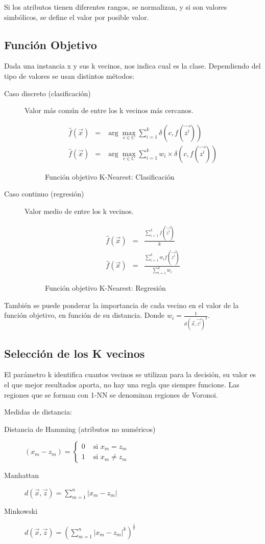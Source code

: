 \documentclass[12pt]{report} %
\begin{document}
Si los atributos tienen diferentes rangos, se normalizan, y si son valores simbólicos, se define el valor por posible valor.
\subsection{Función Objetivo}
Dada una instancia x y sus k vecinos, nos indica cual es la clase. Dependiendo del tipo de valores se usan distintos métodos:
\begin{description}
  \item[Caso discreto (clasificación)] Valor más común de entre los k vecinos más cercanos.
  \begin{figure}[H]
    \begin{eqnarray}
      \hat{f}(\vec{x}) &=& \arg\max _{c \in C} \sum^k_{i=1} \delta(c,f(\vec{z^i})) \\
      \hat{f}(\vec{x}) &=& \arg\max _{c \in C} \sum^k_{i=1} w_i \times \delta(c,f(\vec{z^i}))
    \end{eqnarray}
    \captionsetup{justification=centering}
    \caption{Función objetivo K-Nearest: Clasificación}
  \end{figure} 
  \item[Caso continuo (regresión)] Valor medio de entre los k vecinos. 
  \begin{figure}[H]
    \begin{eqnarray}
      \hat{f}(\vec{x}) &=& \frac{\sum^k_{i=1} f(\vec{z^i})}{k}\\
      \hat{f}(\vec{x}) &=& \frac{\sum^k_{i=1} w_i f(\vec{z^i})}{\sum^k_{i=1} w_i}
    \end{eqnarray}
    \captionsetup{justification=centering}
    \caption{Función objetivo K-Nearest: Regresión}
  \end{figure}
\end{description}
También se puede ponderar la importancia de cada vecino en el valor de la función objetivo, en función de su distancia. Donde $w_i = \frac{1}{d(\vec{x},\vec{z^i})^2}$.

\subsection{Selección de los K vecinos}
El parámetro k identifica cuantos vecinos se utilizan para la decisión, su valor es el que mejor resultados aporta, no hay una regla que siempre funcione. Las regiones que se forman con 1-NN se denominan regiones de Voronoi.

Medidas de distancia:
\begin{description}
  \item[Distancia de Hamming (atributos no numéricos)] $\left(x_{m}-z_{m}\right)=\left\{\begin{array}{ll}0 & \text { si } x_{m}=z_{m} \\ 1 & \text { si } x_{m} \neq z_{m}\end{array}\right.$
  \item[Manhattan] $d(\vec{x}, \vec{z})=\sum_{m=1}^{n}\left|x_{m}-z_{m}\right|$
  \item[Minkowski] $d(\vec{x}, \vec{z})=\left(\sum_{m=1}^{n}\left|x_{m}-z_{m}\right|^{k}\right)^{\frac{1}{k}}$
\end{description}
\pagebreak
\end{document}

